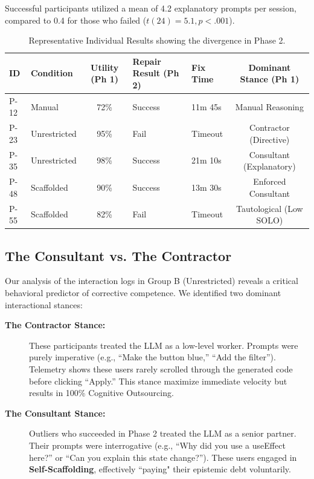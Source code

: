 \documentclass[sigconf]{acmart}
\begin{document}
Successful participants utilized a mean of 4.2 explanatory prompts per session, compared to 0.4 for those who failed ($t(24) = 5.1, p < .001$). 

\begin{table}[ht]
  \caption{Representative Individual Results showing the divergence in Phase 2.}
  \label{tab:individual}
  \begin{tabular}{llcllc}
    \toprule
    ID & Condition & Utility (Ph 1) & Repair Result (Ph 2) & Fix Time & Dominant Stance (Ph 1)\\
    \midrule
    P-12 & Manual & 72\% & Success & 11m 45s & Manual Reasoning\\
    P-23 & Unrestricted & 95\% & Fail & Timeout & Contractor (Directive)\\
    P-35 & Unrestricted & 98\% & Success & 21m 10s & Consultant (Explanatory)\\
    P-48 & Scaffolded & 90\% & Success & 13m 30s & Enforced Consultant\\
    P-55 & Scaffolded & 82\% & Fail & Timeout & Tautological (Low SOLO)\\
    \bottomrule
  \end{tabular}
\end{table}

\subsection{The Consultant vs. The Contractor}
Our analysis of the interaction logs in Group B (Unrestricted) reveals a critical behavioral predictor of corrective competence. We identified two dominant interactional stances:

\begin{description}
    \item[\textbf{The Contractor Stance:}] These participants treated the LLM as a low-level worker. Prompts were purely imperative (e.g., ``Make the button blue,'' ``Add the filter''). Telemetry shows these users rarely scrolled through the generated code before clicking ``Apply.'' This stance maximize immediate velocity but results in 100\% Cognitive Outsourcing.
    \item[\textbf{The Consultant Stance:}] Outliers who succeeded in Phase 2 treated the LLM as a senior partner. Their prompts were interrogative (e.g., ``Why did you use a useEffect here?'' or ``Can you explain this state change?''). These users engaged in \textbf{Self-Scaffolding}, effectively ``paying" their epistemic debt voluntarily.
\end{description}
\end{document}
